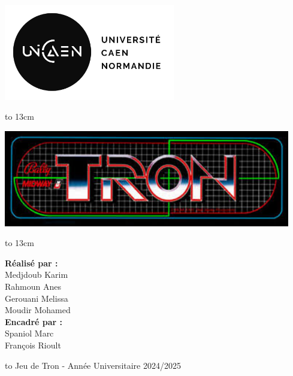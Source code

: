 \documentclass[a4paper,12pt]{article}
\begin{document}
  
  {
   \setlength{\topmargin}{-3cm}
   \begin{titlepage}
     \begin{center}
    
       \centerline{\includegraphics[height=42mm]{logo.png}}
    
       \vspace{5mm}
       {}
    
       \vspace{5mm}
       \centerline{\hbox to 13cm{\hrulefill}}
       \vspace{0.3cm}
       \centerline{\includegraphics[height=42mm]{title.jpeg}}
       \centerline{\hbox to 13cm{\hrulefill}}
    
       \vspace{8mm}
       {\sc \large \textbf{\vspace{3mm}Réalisé par :} \\
       Medjdoub Karim \\
       Rahmoun Anes \\
       Gerouani Melissa \\
       Moudir Mohamed\\ [8mm]
       \large \textbf{\vspace{3mm}Encadré par :} \\
       Spaniol Marc \\
       François Rioult
       }
       \vspace{3mm}
    
       \hbox to \textwidth{\hrulefill}
       {\large Jeu de Tron - Année Universitaire 2024/2025}
     \end{center}
   \end{titlepage}
  }
\end{document}
